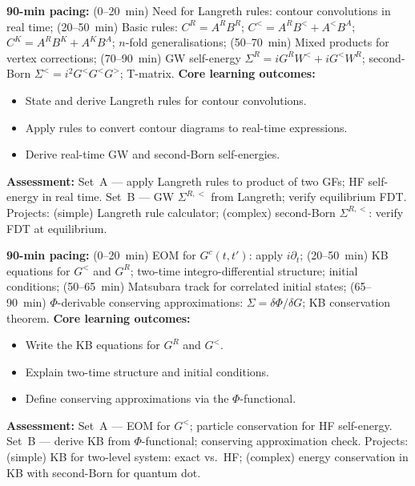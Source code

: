 \documentclass[11pt,a4paper]{article}
\begin{document}
\medskip

\begin{tcolorbox}[modulebox, title={Module~II.5 --- Lecture L04: Langreth Rules}]
\textbf{90-min pacing:} (0--20~min) Need for Langreth rules: contour convolutions in real time; (20--50~min) Basic rules: $C^R=A^R B^R$; $C^<=A^R B^<+A^< B^A$; $C^K=A^R B^K+A^K B^A$; $n$-fold generalisations; (50--70~min) Mixed products for vertex corrections; (70--90~min) GW self-energy $\Sigma^R=iG^RW^<+iG^<W^R$; second-Born $\Sigma^<=i^2G^<G^<G^>$; T-matrix.
\medskip\textbf{Core learning outcomes:}
\begin{itemize}[leftmargin=1.4em,topsep=2pt,itemsep=1pt]
  \item State and derive Langreth rules for contour convolutions.
  \item Apply rules to convert contour diagrams to real-time expressions.
  \item Derive real-time GW and second-Born self-energies.
\end{itemize}
\medskip\textbf{Assessment:}
Set~A --- apply Langreth rules to product of two GFs; HF self-energy in real time.
Set~B --- GW $\Sigma^{R,<}$ from Langreth; verify equilibrium FDT.
Projects: (simple) Langreth rule calculator; (complex) second-Born $\Sigma^{R,<}$: verify FDT at equilibrium.
\end{tcolorbox}

\medskip

\begin{tcolorbox}[modulebox, title={Module~II.5 --- Lecture L05: Kadanoff--Baym Equations}]
\textbf{90-min pacing:} (0--20~min) EOM for $G^c(t,t')$: apply $i\partial_t$; (20--50~min) KB equations for $G^<$ and $G^R$; two-time integro-differential structure; initial conditions; (50--65~min) Matsubara track for correlated initial states; (65--90~min) $\Phi$-derivable conserving approximations: $\Sigma=\delta\Phi/\delta G$; KB conservation theorem.
\medskip\textbf{Core learning outcomes:}
\begin{itemize}[leftmargin=1.4em,topsep=2pt,itemsep=1pt]
  \item Write the KB equations for $G^R$ and $G^<$.
  \item Explain two-time structure and initial conditions.
  \item Define conserving approximations via the $\Phi$-functional.
\end{itemize}
\medskip\textbf{Assessment:}
Set~A --- EOM for $G^<$; particle conservation for HF self-energy.
Set~B --- derive KB from $\Phi$-functional; conserving approximation check.
Projects: (simple) KB for two-level system: exact vs.\ HF; (complex) energy conservation in KB with second-Born for quantum dot.
\end{tcolorbox}
\end{document}
